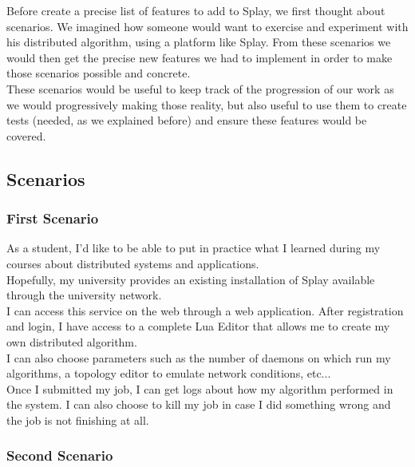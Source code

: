 \documentclass{eplmastersthesis}
\begin{document}
     Before create a precise list of features to add to Splay, we first
     thought about scenarios. We imagined how someone would want to exercise
     and experiment with his distributed algorithm, using a platform like
     Splay. From these scenarios we would then get the precise new features
     we had to implement in order to make those scenarios possible and
     concrete.\\

     These scenarios would be useful to keep track of the progression of our
     work as we would progressively making those reality, but also useful
     to use them to create tests (needed, as we explained before) and ensure
     these features would be covered.

      \subsection{Scenarios} %

        \subsubsection{First Scenario}

          As a student, I'd like to be able to put in practice what I learned
          during my courses about distributed systems and applications.\\
          Hopefully, my university provides an existing installation of Splay
          available through the university network.\\
          I can access this service on the web through a web application. After
          registration and login, I have access to a complete Lua Editor that
          allows me to create my own distributed algorithm.\\
          I can also choose parameters such as the number of daemons on
          which run my algorithms, a topology editor to emulate network
          conditions, etc...\\
          Once I submitted my job, I can get logs about how my algorithm
          performed in the system. I can also choose to kill my job in case
          I did something wrong and the job is not finishing at all.

        \subsubsection{Second Scenario}
\end{document}
